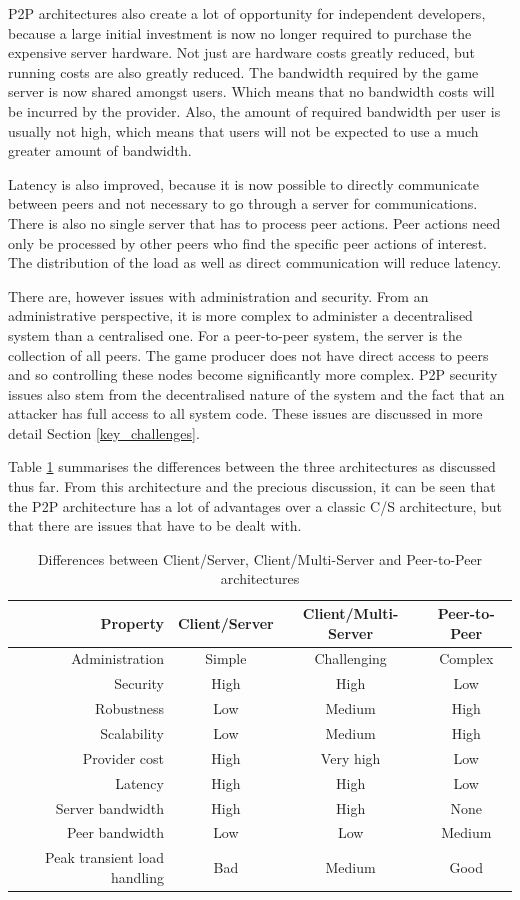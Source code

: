 \documentclass[journal,oneside,a4paper,onecolumn]{IEEEtran}
\begin{document}
\ac{P2P} architectures also create a lot of opportunity for independent developers, because a large initial investment is now no longer required to purchase the expensive server hardware. Not just are hardware costs greatly reduced, but running costs are also greatly reduced. The bandwidth required by the game server is now shared amongst users. Which means that no bandwidth costs will be incurred by the provider. Also, the amount of required bandwidth per user is usually not high, which means that users will not be expected to use a much greater amount of bandwidth.

Latency is also improved, because it is now possible to directly communicate between peers and not necessary to go through a server for communications. There is also no single server that has to process peer actions. Peer actions need only be processed by other peers who find the specific peer actions of interest. The distribution of the load as well as direct communication will reduce latency.

There are, however issues with administration and security. From an administrative perspective, it is more complex to administer a decentralised system than a centralised one. For a peer-to-peer system, the server is the collection of all peers. The game producer does not have direct access to peers and so controlling these nodes become significantly more complex. P2P security issues also stem from the decentralised nature of the system and the fact that an attacker has full access to all system code. These issues are discussed in more detail Section \ref{key_challenges}.

Table \ref{tab_archs} summarises the differences between the three architectures as discussed thus far. From this architecture and the precious discussion, it can be seen that the P2P architecture has a lot of advantages over a classic C/S architecture, but that there are issues that have to be dealt with.
%
\begin{table}[htbp]
\centering
\begin{tabular}{|r|c|c|c|}
\hline
Property & Client/Server & Client/Multi-Server & Peer-to-Peer\\
\hline
Administration & Simple & Challenging & Complex\\
Security & High & High & Low\\
Robustness & Low & Medium & High\\
Scalability & Low & Medium & High\\
Provider cost & High & Very high & Low\\
Latency & High & High & Low\\
Server bandwidth & High & High & None\\
Peer bandwidth & Low & Low & Medium\\
Peak transient load handling & Bad & Medium & Good\\
\hline
\end{tabular}
\caption{Differences between Client/Server, Client/Multi-Server and Peer-to-Peer architectures}
\label{tab_archs}
\end{table}
\end{document}
